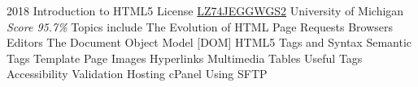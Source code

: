 \documentclass[11pt,a4paper]{moderncv}
\begin{document}
\cventry
    {2018}
    {Introduction to HTML5}
    {License
        \href{https://www.coursera.org/account/accomplishments/records/LZ74JEGGWGS2}
        {LZ74JEGGWGS2}
    }
    {University of Michigan}
    {\textit{Score 95.7\%}}
    {
        Topics include                                                                                            %
            The Evolution of HTML                                                                                 %
            Page Requests                                                                                         %
            Browsers                                                                                              %
            Editors                                                                                               %
            The Document Object Model [DOM]                                                                       %
            HTML5 Tags and Syntax                                                                                 %
            Semantic Tags                                                                                         %
            Template Page                                                                                         %
            Images                                                                                                %
            Hyperlinks                                                                                            %
            Multimedia                                                                                            %
            Tables                                                                                                %
            Useful Tags                                                                                           %
            Accessibility                                                                                         %
            Validation                                                                                            %
            Hosting                                                                                               %
            cPanel                                                                                                %
            Using SFTP                                                                                            %
    }
\end{document}
